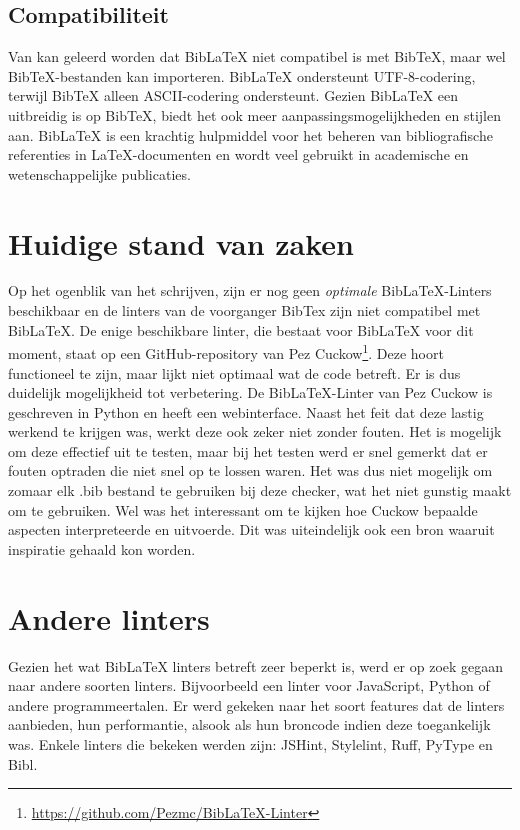 \subsection{Compatibiliteit}
Van \textcite{Oetiker2023} kan geleerd worden dat BibLaTeX niet compatibel is met BibTeX, maar wel BibTeX-bestanden kan importeren. BibLaTeX ondersteunt UTF-8-codering, terwijl BibTeX alleen ASCII-codering ondersteunt. Gezien BibLaTeX een uitbreidig is op BibTeX, biedt het ook meer aanpassingsmogelijkheden en stijlen aan. BibLaTeX is een krachtig hulpmiddel voor het beheren van bibliografische referenties in \LaTeX-documenten en wordt veel gebruikt in academische en wetenschappelijke publicaties. 

\section{Huidige stand van zaken}
Op het ogenblik van het schrijven, zijn er nog geen \emph{optimale} BibLaTeX-Linters beschikbaar en de linters van de voorganger BibTex zijn niet compatibel met BibLaTeX. De enige beschikbare linter, die bestaat voor BibLaTeX voor dit moment, staat op een GitHub-repository van Pez Cuckow\footnote{\url{https://github.com/Pezmc/BibLaTeX-Linter}}. Deze hoort functioneel te zijn, maar lijkt niet optimaal wat de code betreft. Er is dus duidelijk mogelijkheid tot verbetering. De BibLaTeX-Linter van Pez Cuckow is geschreven in Python en heeft een webinterface. Naast het feit dat deze lastig werkend te krijgen was, werkt deze ook zeker niet zonder fouten. Het is mogelijk om deze effectief uit te testen, maar bij het testen werd er snel gemerkt dat er fouten optraden die niet snel op te lossen waren. Het was dus niet mogelijk om zomaar elk .bib bestand te gebruiken bij deze checker, wat het niet gunstig maakt om te gebruiken. Wel was het interessant om te kijken hoe Cuckow bepaalde aspecten interpreteerde en uitvoerde. Dit was uiteindelijk ook een bron waaruit inspiratie gehaald kon worden.

\section{Andere linters}
Gezien het wat BibLaTeX linters betreft zeer beperkt is, werd er op zoek gegaan naar andere soorten linters. Bijvoorbeeld een linter voor JavaScript, Python of andere programmeertalen. Er werd gekeken naar het soort features dat de linters aanbieden, hun performantie, alsook als hun broncode indien deze toegankelijk was. Enkele linters die bekeken werden zijn: JSHint, Stylelint, Ruff, PyType en Bibl.

